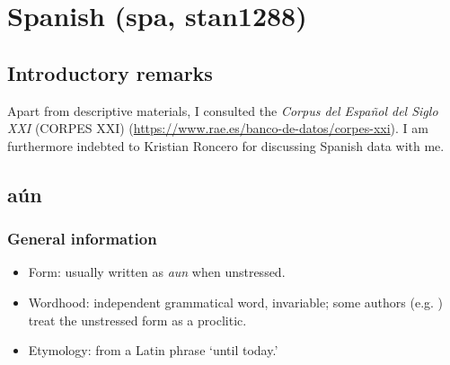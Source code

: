 \section{Spanish (spa, stan1288)}
\subsection{Introductory remarks}
Apart from descriptive materials, I consulted the \textit{Corpus del Español del Siglo XXI} (CORPES XXI) (\url{https://www.rae.es/banco-de-datos/corpes-xxi}). I am furthermore indebted to  Kristian Roncero for discussing Spanish data with me.

\subsection{aún}
\subsubsection{General information}
\begin{itemize}
	\item Form: usually written as \textit{aun} when unstressed.
	\item Wordhood: independent grammatical word, invariable; some authors (e.g. \cite{Trujillo1990}) treat the unstressed form as a proclitic.
	\item Etymology: from a Latin phrase \lq until today.'
\end{itemize}

